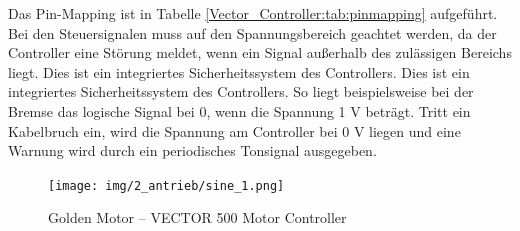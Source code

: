 Das Pin-Mapping ist in Tabelle \ref{Vector_Controller:tab:pinmapping} aufgeführt. Bei den Steuersignalen muss auf den Spannungsbereich geachtet werden, da der Controller eine Störung meldet, wenn ein Signal außerhalb des zulässigen Bereichs liegt. Dies ist ein integriertes Sicherheitssystem des Controllers. Dies ist ein integriertes Sicherheitssystem des Controllers. So liegt beispielsweise bei der Bremse das logische Signal bei 0, wenn die Spannung 1 V beträgt. Tritt ein Kabelbruch ein, wird die Spannung am Controller bei 0 V liegen und eine Warnung wird durch ein periodisches Tonsignal ausgegeben.


\begin{figure}[!ht]
	\begin{center}
		\texttt{[image: img/2\_antrieb/sine\_1.png]}
		\caption{Golden Motor – VECTOR 500 Motor Controller}
		\label{Vector_Controller:img:Antrieb_Controller}
	\end{center}
\end{figure}

